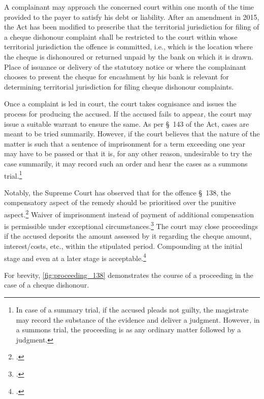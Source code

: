 A complainant may approach the concerned court within one month of the time provided to the payer to satisfy his debt or liability. After an amendment in 2015, the Act has been modified to prescribe that the territorial jurisdiction for filing of a cheque dishonour complaint shall be restricted to the court within whose territorial jurisdiction the offence is committed, i.e., which is the location where the cheque is dishonoured or returned unpaid by the bank on which it is drawn. Place of issuance or delivery of the statutory notice or where the complainant chooses to present the cheque for encashment by his bank is relevant for determining territorial jurisdiction for filing cheque dishonour complaints.

Once a complaint is led in court, the court takes cognisance and issues the process for producing the accused. If the accused fails to appear, the court may issue a suitable warrant to ensure the same. As per \S~143 of the Act, cases are meant to be tried summarily. However, if the court believes that the nature of the matter is such that a sentence of imprisonment for a term exceeding one year may have to be passed or that it is, for any other reason, undesirable to try the case summarily, it may record such an order and hear the cases as a summons trial.\footnote{In case of a summary trial, if the accused pleads not guilty, the magistrate may record the substance of the evidence and deliver a judgment. However, in a summons trial, the proceeding is as any ordinary matter followed by a judgment.}

Notably, the Supreme Court has observed that for the offence \S~138, the compensatory aspect of the remedy should be prioritised over the punitive aspect.\footcite{sc2010_damodar} Waiver of imprisonment instead of payment of additional compensation is permissible under exceptional circumstances.\footcite{sc2018_priyanka} The court may close proceedings if the accused deposits the amount assessed by it regarding the cheque amount, interest/costs, etc., within the stipulated period. Compounding at the initial stage and even at a later stage is acceptable.\footcite{sc2018_meters} 

For brevity, \cref{fig:proceeding_138} demonstrates the course of a proceeding in the case of a cheque dishonour.

